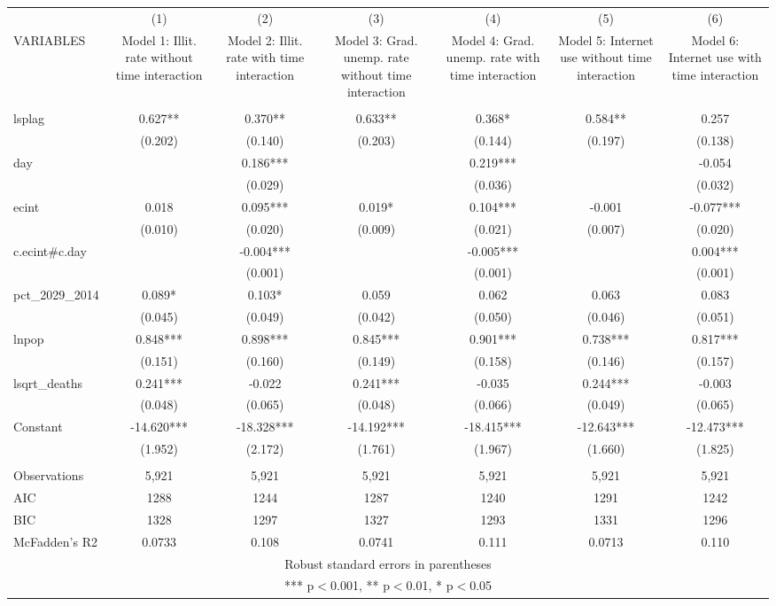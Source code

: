 \documentclass[]{article}
\begin{document}
\begin{tabular}{lcccccc} \hline
 & (1) & (2) & (3) & (4) & (5) & (6) \\
VARIABLES & Model 1: Illit. rate without time interaction & Model 2: Illit. rate with time interaction & Model 3: Grad. unemp. rate without time interaction & Model 4: Grad. unemp. rate with time interaction & Model 5: Internet use without time interaction & Model 6: Internet use with time interaction \\ \hline
 &  &  &  &  &  &  \\
lsplag & 0.627** & 0.370** & 0.633** & 0.368* & 0.584** & 0.257 \\
 & (0.202) & (0.140) & (0.203) & (0.144) & (0.197) & (0.138) \\
day &  & 0.186*** &  & 0.219*** &  & -0.054 \\
 &  & (0.029) &  & (0.036) &  & (0.032) \\
ecint & 0.018 & 0.095*** & 0.019* & 0.104*** & -0.001 & -0.077*** \\
 & (0.010) & (0.020) & (0.009) & (0.021) & (0.007) & (0.020) \\
c.ecint\#c.day &  & -0.004*** &  & -0.005*** &  & 0.004*** \\
 &  & (0.001) &  & (0.001) &  & (0.001) \\
pct\_2029\_2014 & 0.089* & 0.103* & 0.059 & 0.062 & 0.063 & 0.083 \\
 & (0.045) & (0.049) & (0.042) & (0.050) & (0.046) & (0.051) \\
lnpop & 0.848*** & 0.898*** & 0.845*** & 0.901*** & 0.738*** & 0.817*** \\
 & (0.151) & (0.160) & (0.149) & (0.158) & (0.146) & (0.157) \\
lsqrt\_deaths & 0.241*** & -0.022 & 0.241*** & -0.035 & 0.244*** & -0.003 \\
 & (0.048) & (0.065) & (0.048) & (0.066) & (0.049) & (0.065) \\
Constant & -14.620*** & -18.328*** & -14.192*** & -18.415*** & -12.643*** & -12.473*** \\
 & (1.952) & (2.172) & (1.761) & (1.967) & (1.660) & (1.825) \\
 &  &  &  &  &  &  \\
Observations & 5,921 & 5,921 & 5,921 & 5,921 & 5,921 & 5,921 \\
AIC & 1288 & 1244 & 1287 & 1240 & 1291 & 1242 \\
BIC & 1328 & 1297 & 1327 & 1293 & 1331 & 1296 \\
 McFadden's R2 & 0.0733 & 0.108 & 0.0741 & 0.111 & 0.0713 & 0.110 \\ \hline
\multicolumn{7}{c}{ Robust standard errors in parentheses} \\
\multicolumn{7}{c}{ *** p$<$0.001, ** p$<$0.01, * p$<$0.05} \\
\end{tabular}
\end{document}
